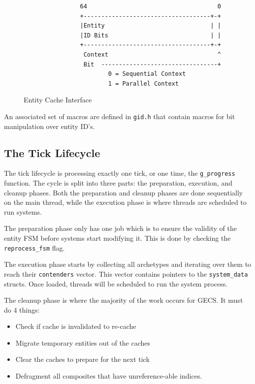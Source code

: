 \begin{figure}[H]
\begin{verbatim}
                64                                     0                                
                +------------------------------------+-+                                
                |Entity                              | |                                
                |ID Bits                             | |                                
                +------------------------------------+-+                                
                 Context                               ^                                
                 Bit  ---------------------------------+                                
                        0 = Sequential Context                                        
                        1 = Parallel Context                                          
\end{verbatim}
\caption{Entity Cache Interface}
\label{code:component_retrieval}
\end{figure}

An associated set of macros are defined in \texttt{gid.h} that contain macros for bit manipulation over entity ID's.

\subsection{The Tick Lifecycle}
The tick lifecycle is processing exactly one tick, or one time, the \texttt{g\_progress} function. The cycle is split into three parts: the preparation, execution, and cleanup phases. Both the preparation and cleanup phases are done sequentially on the main thread, while the execution phase is where threads are scheduled to run systems.

The preparation phase only has one job which is to ensure the validity of the entity FSM before systems start modifying it. This is done by checking the \texttt{reprocess\_fsm} flag.

The execution phase starts by collecting all archetypes and iterating over them to reach their \texttt{contenders} vector. This vector contains pointers to the \texttt{system\_data} structs. Once loaded, threads will be scheduled to run the system process.

The cleanup phase is where the majority of the work occurs for GECS. It must do 4 things:
\begin{itemize}
    \item Check if cache is invalidated to re-cache
    \item Migrate temporary entities out of the caches
    \item Clear the caches to prepare for the next tick
    \item Defragment all composites that have unreference-able indices.
\end{itemize}


